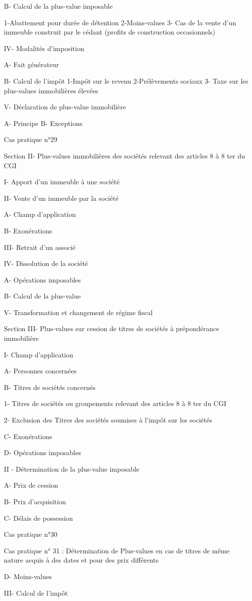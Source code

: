 			B- Calcul de la plus-value imposable

1-Abattement pour durée de détention
2-Moins-values
3- Cas de la vente d'un immeuble construit par le cédant (profits de construction occasionnels)

		IV- Modalités d'imposition 

			A- Fait générateur 
			
B- Calcul de l'impôt
				1-Impôt sur le revenu
				2-Prélèvements sociaux
				3- Taxe sur les plus-values immobilières élevées

		V- Déclaration de plus-value immobilière

			A- Principe
			B- Exceptions

	Cas pratique n°29
	
Section II- Plus-values immobilières des sociétés relevant des articles 8 à 8 ter du CGI


I- Apport d'un immeuble à une société


II- Vente d'un immeuble par la société


A- Champ d'application

B- Exonérations


III- Retrait d'un associé


IV- Dissolution de la société


A- Opérations imposables

B- Calcul de la plus-value 


V- Transformation et changement de régime fiscal



Section III- Plus-values sur cession de titres de sociétés à prépondérance immobilière


I- Champ d'application


A- Personnes concernées

B- Titres de sociétés concernés

1- Titres de sociétés ou groupements relevant des articles 8 à 8 ter du CGI

2- Exclusion des Titres des sociétés soumises à l'impôt sur les sociétés

C- Exonérations

D- Opérations imposables


II - Détermination de la plus-value imposable


A- Prix de cession

B- Prix d'acquisition

C- Délais de possession


Cas pratique n°30


Cas pratique n° 31 : 	Détermination de Plus-values en cas de titres de même nature acquis à des dates et pour des prix différents


D- Moins-values


III- Calcul de l'impôt



